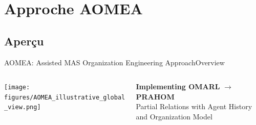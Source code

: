 

\section{Approche AOMEA}

\subsection{Aperçu}

\begin{frame}{AOMEA: Assisted MAS Organization Engineering Approach}{Overview}

    \begin{columns}

        \hspace{-7ex}
        \begin{column}{0.5\textwidth}

            \centering
            \vspace{-23.5ex}
            \texttt{[image: figures/AOMEA\_illustrative\_global\_view.png]}

        \end{column}

        \hspace{-5ex}
        \begin{column}{0.5\textwidth}
            {\small \textbf{Implementing OMARL} $\rightarrow$ \textbf{PRAHOM} \\ { \footnotesize Partial Relations with Agent History and Organization Model}}


\end{column}
\end{columns}
\end{frame}
